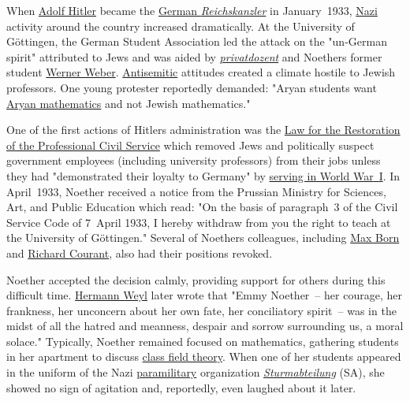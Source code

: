 When \href{https://en.wikipedia.org/wiki/Adolf_Hitler}{Adolf Hitler} became the \href{https://en.wikipedia.org/wiki/Chancellor_of_Germany_(German_Reich)}{German \emph{Reichskanzler}} in January{~}1933, \href{https://en.wikipedia.org/wiki/Nazi}{Nazi} activity around the country increased dramatically. At the University of Göttingen, the German Student Association led the attack on the "un-German spirit" attributed to Jews and was aided by \emph{\href{https://en.wikipedia.org/wiki/Privatdozent}{privatdozent}} and Noether\textquotesingle s former student \href{https://en.wikipedia.org/wiki/Werner_Weber_(mathematician)}{Werner Weber}. \href{https://en.wikipedia.org/wiki/Antisemitic}{Antisemitic} attitudes created a climate hostile to Jewish professors. One young protester reportedly demanded: "Aryan students want \href{https://en.wikipedia.org/wiki/Deutsche_Mathematik}{Aryan mathematics} and not Jewish mathematics."

One of the first actions of Hitler\textquotesingle s administration was the \href{https://en.wikipedia.org/wiki/Law_for_the_Restoration_of_the_Professional_Civil_Service}{Law for the Restoration of the Professional Civil Service} which removed Jews and politically suspect government employees (including university professors) from their jobs unless they had "demonstrated their loyalty to Germany" by \href{https://en.wikipedia.org/wiki/Frontkämpferprivileg}{serving in World War{~}I}. In April{~}1933, Noether received a notice from the Prussian Ministry for Sciences, Art, and Public Education which read: "On the basis of paragraph{~}3 of the Civil Service Code of 7{~}April 1933, I hereby withdraw from you the right to teach at the University of Göttingen." Several of Noether\textquotesingle s colleagues, including \href{https://en.wikipedia.org/wiki/Max_Born}{Max Born} and \href{https://en.wikipedia.org/wiki/Richard_Courant}{Richard Courant}, also had their positions revoked.

Noether accepted the decision calmly, providing support for others during this difficult time. \href{https://en.wikipedia.org/wiki/Hermann_Weyl}{Hermann Weyl} later wrote that "Emmy Noether{~}{--}{ }her courage, her frankness, her unconcern about her own fate, her conciliatory spirit{~}{--}{ }was in the midst of all the hatred and meanness, despair and sorrow surrounding us, a moral solace." Typically, Noether remained focused on mathematics, gathering students in her apartment to discuss \href{https://en.wikipedia.org/wiki/Class_field_theory}{class field theory}. When one of her students appeared in the uniform of the Nazi \href{https://en.wikipedia.org/wiki/Paramilitary}{paramilitary} organization \emph{\href{https://en.wikipedia.org/wiki/Sturmabteilung}{Sturmabteilung}} (SA), she showed no sign of agitation and, reportedly, even laughed about it later.


